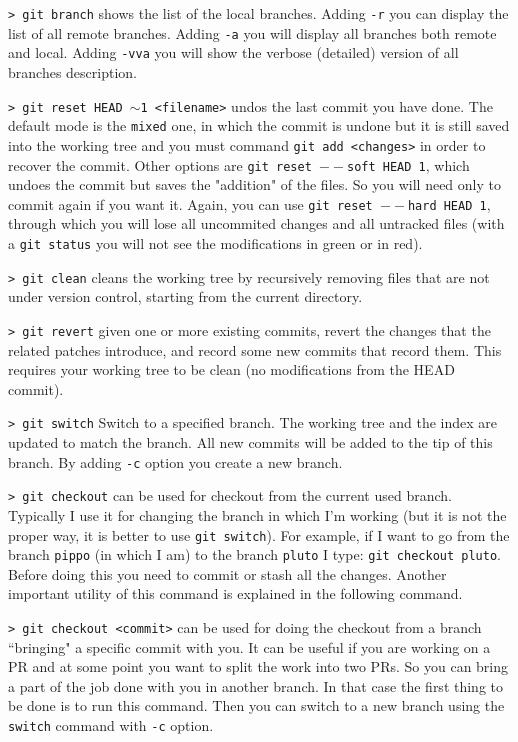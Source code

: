 \documentclass[11pt]{article}
\newcommand{\cmd}[1]{\colorbox{light-gray}{\textcolor{gio}{\texttt{#1}}}}
\begin{document}
\begin{multicols}{2}
\cmd{> git branch} shows the list of the local branches. Adding \texttt{-r} you 
can display the list of all remote branches. Adding \texttt{-a} you will display 
all branches both remote and local. Adding \cmd{-vva} you will show the verbose 
(detailed) version of all branches description.  

\cmd{> git reset HEAD $\sim$1 <filename>} undos the last commit you have done. 
The default mode is the \texttt{mixed} one, in which the commit is undone but it 
is still saved into the working tree and you must command \texttt{git add <changes>} 
in order to recover the commit. Other options are \texttt{git reset $--$soft HEAD~1}, 
which undoes the commit but saves the "addition" of the files. So you will need 
only to commit again if you want it. Again, you can use \texttt{git reset $--$hard HEAD~1}, 
through which you will lose all uncommited changes and all untracked files 
(with a \texttt{git status} you will not see the modifications in green or in red).

\cmd{> git clean} cleans the working tree by recursively removing files that are 
not under version control, starting from the current directory.

\cmd{> git revert} given one or more existing commits, revert the changes that 
the related patches introduce, and record some new commits that record them. 
This requires your working tree to be clean (no modifications from the HEAD commit).

\cmd{> git switch} Switch to a specified branch. The working tree and the index 
are updated to match the branch. All new commits will be added to the tip of this branch.
By adding \texttt{-c} option you create a new branch.

\cmd{> git checkout} can be used for checkout from the current used branch. Typically
I use it for changing the branch in which I'm working (but it is not the proper
way, it is better to use \texttt{git switch}). For example, if I want to
go from the branch \texttt{pippo} (in which I am) to the branch \texttt{pluto} 
I type: \texttt{git checkout pluto}. Before doing this you need to commit or stash 
all the changes. Another important utility of this command is explained in the
following command.

\cmd{> git checkout <commit>} can be used for doing the checkout from a branch 
``bringing" a specific commit with you. It can be useful if you are working on a
PR and at some point you want to split the work into two PRs. So you can bring a 
part of the job done with you in another branch. In that case the first thing to 
be done is to run this command. Then you can switch to a new branch using the 
\texttt{switch} command with \texttt{-c} option. 




\end{multicols}
\end{document}
